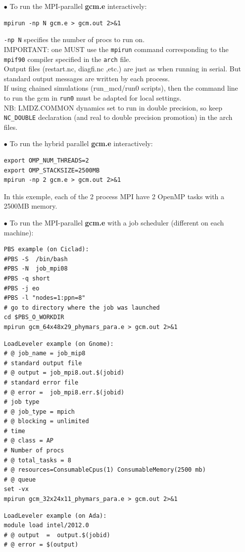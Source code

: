 \begin{itemize}
\item [$\bullet$] To run the MPI-parallel {\bf gcm.e} interactively:
\begin{verbatim}
mpirun -np N gcm.e > gcm.out 2>&1
\end{verbatim}
\verb|-np N| specifies the number of procs to run on.\\
IMPORTANT: one MUST use the \verb|mpirun| command corresponding to the \verb|mpif90| compiler specified in the \verb|arch| file.\\
Output files (restart.nc, diagfi.nc ,etc.) are just as when running in serial. But standard output messages are written by each process.\\
If using chained simulations (run\_mcd/run0 scripts), then the command line to run the gcm in \verb|run0| must be adapted for local settings.\\
NB: LMDZ.COMMON dynamics set to run in double precision, so keep \verb|NC_DOUBLE| declaration (and real to double precision promotion) in the arch files.
\item [$\bullet$] To run the hybrid parallel {\bf gcm.e} interactively:
\begin{verbatim}
export OMP_NUM_THREADS=2
export OMP_STACKSIZE=2500MB
mpirun -np 2 gcm.e > gcm.out 2>&1
\end{verbatim}
In this exemple, each of the 2 process MPI have 2 OpenMP tasks with a 2500MB memory.
\item[$\bullet$] To run the MPI-parallel {\bf gcm.e} with a job scheduler (different on each machine):
\begin{verbatim}
PBS example (on Ciclad):
#PBS -S  /bin/bash
#PBS -N  job_mpi08
#PBS -q short
#PBS -j eo
#PBS -l "nodes=1:ppn=8"
# go to directory where the job was launched
cd $PBS_O_WORKDIR
mpirun gcm_64x48x29_phymars_para.e > gcm.out 2>&1
\end{verbatim}
\begin{verbatim}
LoadLeveler example (on Gnome):
# @ job_name = job_mip8
# standard output file  
# @ output = job_mpi8.out.$(jobid)
# standard error file
# @ error =  job_mpi8.err.$(jobid)
# job type
# @ job_type = mpich
# @ blocking = unlimited
# time
# @ class = AP
# Number of procs 
# @ total_tasks = 8
# @ resources=ConsumableCpus(1) ConsumableMemory(2500 mb)
# @ queue
set -vx
mpirun gcm_32x24x11_phymars_para.e > gcm.out 2>&1
\end{verbatim}
\begin{verbatim}
LoadLeveler example (on Ada):
module load intel/2012.0
# @ output  =  output.$(jobid)
# @ error = $(output)

\end{verbatim}
\end{itemize}
